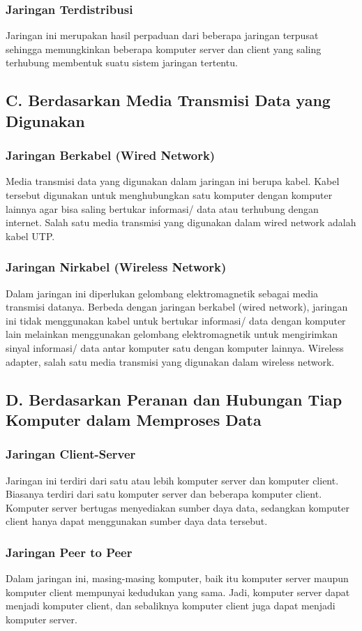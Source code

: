   \subsubsection{ Jaringan Terdistribusi}
  Jaringan ini merupakan hasil perpaduan dari beberapa jaringan terpusat sehingga memungkinkan beberapa komputer server dan client yang saling terhubung membentuk suatu sistem jaringan tertentu.
\subsection{C. Berdasarkan Media Transmisi Data yang Digunakan}
  \subsubsection{Jaringan Berkabel (Wired Network)}
    Media transmisi data yang digunakan dalam jaringan ini berupa kabel. Kabel tersebut digunakan untuk menghubungkan satu komputer dengan komputer lainnya agar bisa saling bertukar informasi/ data atau terhubung dengan internet. Salah satu media transmisi yang digunakan dalam wired network adalah kabel UTP.
  \subsubsection{ Jaringan Nirkabel (Wireless Network)}
    Dalam jaringan ini diperlukan gelombang elektromagnetik sebagai media transmisi datanya. Berbeda dengan jaringan berkabel (wired network), jaringan ini tidak menggunakan kabel untuk bertukar informasi/ data dengan komputer lain melainkan menggunakan gelombang elektromagnetik untuk mengirimkan sinyal informasi/ data antar komputer satu dengan komputer lainnya. Wireless adapter, salah satu media transmisi yang digunakan dalam wireless network.
\subsection{D. Berdasarkan Peranan dan Hubungan Tiap Komputer dalam Memproses Data}
  \subsubsection{ Jaringan Client-Server}
    Jaringan ini terdiri dari satu atau lebih komputer server dan komputer client. Biasanya terdiri dari satu komputer server dan beberapa komputer client. Komputer server bertugas menyediakan sumber daya data, sedangkan komputer client hanya dapat menggunakan sumber daya data tersebut.
  \subsubsection{ Jaringan Peer to Peer}
    Dalam jaringan ini, masing-masing komputer, baik itu komputer server maupun komputer client mempunyai kedudukan yang sama. Jadi, komputer server dapat menjadi komputer client, dan sebaliknya komputer client juga dapat menjadi komputer server.
